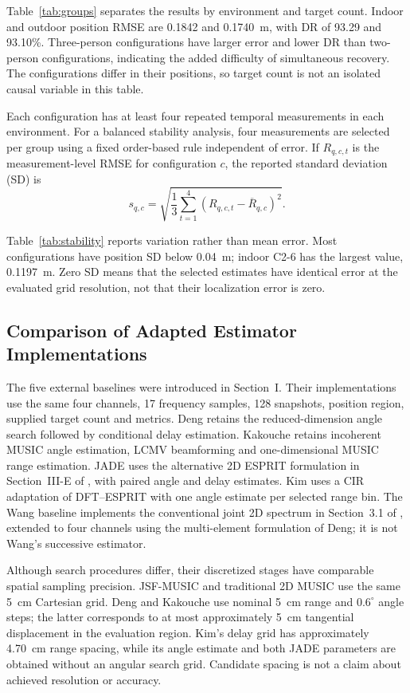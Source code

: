
Table~\ref{tab:groups} separates the results by environment and target count. Indoor and outdoor position RMSE are 0.1842 and 0.1740~m, with DR of 93.29 and 93.10\%. Three-person configurations have larger error and lower DR than two-person configurations, indicating the added difficulty of simultaneous recovery. The configurations differ in their positions, so target count is not an isolated causal variable in this table.

Each configuration has at least four repeated temporal measurements in each environment. For a balanced stability analysis, four measurements are selected per group using a fixed order-based rule independent of error. If $R_{q,c,t}$ is the measurement-level RMSE for configuration $c$, the reported standard deviation (SD) is
\begin{equation}
s_{q,c}=\sqrt{\frac{1}{3}\sum_{t=1}^{4}
(R_{q,c,t}-\overline R_{q,c})^2}.
\label{eq:stability}
\end{equation}

Table~\ref{tab:stability} reports variation rather than mean error. Most configurations have position SD below 0.04~m; indoor C2-6 has the largest value, 0.1197~m. Zero SD means that the selected estimates have identical error at the evaluated grid resolution, not that their localization error is zero.

\subsection{Comparison of Adapted Estimator Implementations}
The five external baselines were introduced in Section~I. Their implementations use the same four channels, 17 frequency samples, 128 snapshots, position region, supplied target count and metrics. Deng retains the reduced-dimension angle search followed by conditional delay estimation. Kakouche retains incoherent MUSIC angle estimation, LCMV beamforming and one-dimensional MUSIC range estimation. JADE uses the alternative 2D ESPRIT formulation in Section~III-E of \cite{vanderveen1998jade}, with paired angle and delay estimates. Kim uses a CIR adaptation of DFT--ESPRIT with one angle estimate per selected range bin. The Wang baseline implements the conventional joint 2D spectrum in Section~3.1 of \cite{wang2014successive}, extended to four channels using the multi-element formulation of Deng; it is not Wang's successive estimator.

Although search procedures differ, their discretized stages have comparable spatial sampling precision. JSF-MUSIC and traditional 2D MUSIC use the same 5~cm Cartesian grid. Deng and Kakouche use nominal 5~cm range and $0.6^\circ$ angle steps; the latter corresponds to at most approximately 5~cm tangential displacement in the evaluation region. Kim's delay grid has approximately 4.70~cm range spacing, while its angle estimate and both JADE parameters are obtained without an angular search grid. Candidate spacing is not a claim about achieved resolution or accuracy.

